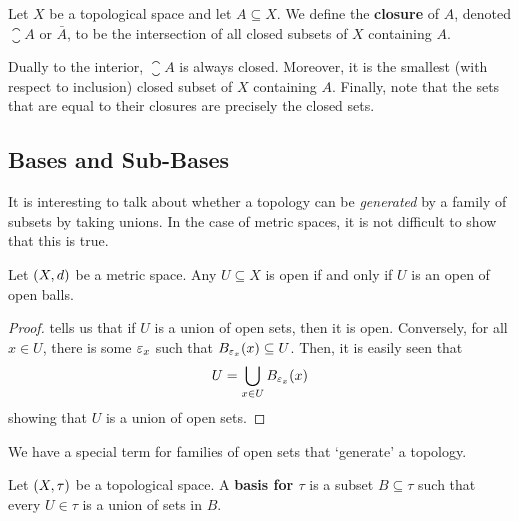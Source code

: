
\begin{boxdefinition}[Closure]
    Let $X$ be a topological space and let $A \subseteq X$. We define the \textbf{closure} of $A$, denoted $\closure{A}$ or $\bar{A}$, to be the intersection of all closed subsets of $X$ containing $A$.
\end{boxdefinition}

Dually to the interior, $\closure{A}$ is always closed. Moreover, it is the smallest (with respect to inclusion) closed subset of $X$ containing $A$. Finally, note that the sets that are equal to their closures are precisely the closed sets.

\subsection{Bases and Sub-Bases}

It is interesting to talk about whether a topology can be \textit{generated} by a family of subsets by taking unions. In the case of metric spaces, it is not difficult to show that this is true.

\begin{boxproposition}\label{Ch1:Prop:Met_Top_gen_by_open_balls}
    Let $\left( X, d \right)$ be a metric space. Any $U \subseteq X$ is open if and only if $U$ is an open of open balls.
\end{boxproposition}
\begin{proof}
     tells us that if $U$ is a union of open sets, then it is open. Conversely, for all $x \in U$, there is some $\varepsilon_x$ such that $B_{\varepsilon_x}(x) \subseteq U$. Then, it is easily seen that
    \begin{align*}
        U = \bigcup_{x \in U} B_{\varepsilon_x}(x)
    \end{align*}
    showing that $U$ is a union of open sets.
\end{proof}

We have a special term for families of open sets that `generate' a topology.

\begin{boxdefinition}
    Let $\left( X, \tau \right)$ be a topological space. A \textbf{basis for $\tau$} is a subset $B \subseteq \tau$ such that every $U \in \tau$ is a union of sets in $B$.
\end{boxdefinition}

